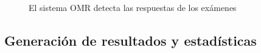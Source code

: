 \documentclass[a4paper, 12pt]{book}
\begin{document}
\begin{figure}
  \centering
  \caption{El sistema OMR detecta las respuestas de los exámenes}
  \label{figura:deteccion_respuestas}
\end{figure}

\subsection{Generación de resultados y estadísticas}
\label{subsec:estadisticas}
\end{document}
